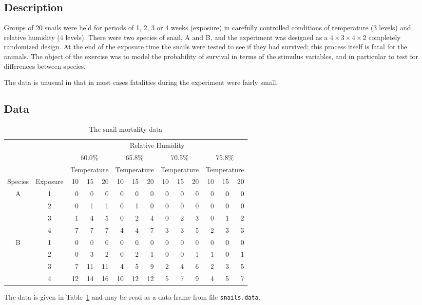 \documentclass{article}
\newcommand{\strutt}{\vrule height 2.5ex depth 0.5ex width 0ex}%
\newcommand{\code}[1]{\texttt{#1}}
\begin{document}
\subsection*{Description}
Groups of 20 snails were held for periods of 1, 2, 3 or 4 weeks (exposure)
in carefully controlled conditions of temperature (3 levels) and relative
humidity (4 levels).  There were two species of snail, A and B, and the
experiment was designed as a $4\times3\times4\times2$ completely randomized
design.  At the end of the exposure time the snails were tested to see if
they had survived; this process itself is fatal for the animals.  The
object of the exercise was to model the probability of survival in terms of
the stimulus variables, and in particular to test for differences between
species.

The data is unusual in that in most cases fatalities during the experiment
were fairly small.

\subsection*{Data}

\begin{table}[ht]
\begin{center}
\begin{tabular}{@{\protect\strutt}|c|c||*{4}{rrr|}}
\hline
\multicolumn{2}{|c||}{}&\multicolumn{12}{c|}{Relative Humidity}\\
\multicolumn{2}{|c||}{}&\multicolumn{3}{c}{60.0\%}&\multicolumn{3}{c}{65.8\%}&%
  \multicolumn{3}{c}{70.5\%}&\multicolumn{3}{c|}{75.8\%}\\
\hline
\multicolumn{2}{|c||}{}&\multicolumn{3}{c|}{Temperature}&%
\multicolumn{3}{|c|}{Temperature}&\multicolumn{3}{c|}{Temperature}&%
\multicolumn{3}{c|}{Temperature}\\
\multicolumn{1}{|c}{Species}& Exposure &
             10 & 15 & 20 & 10 & 15 & 20 & 10 & 15 & 20 & 10 & 15 & 20\\
\hline
A   &  1 &    0 &  0 &  0 &  0 &  0 &  0 &  0 &  0 &  0 &  0 &  0 &  0\\
    &  2 &    0 &  1 &  1 &  0 &  1 &  0 &  0 &  0 &  0 &  0 &  0 &  0\\
    &  3 &    1 &  4 &  5 &  0 &  2 &  4 &  0 &  2 &  3 &  0 &  1 &  2\\
    &  4 &    7 &  7 &  7 &  4 &  4 &  7 &  3 &  3 &  5 &  2 &  3 &  3\\
\hline
\hline
B   &  1 &    0 &  0 &  0 &  0 &  0 &  0 &  0 &  0 &  0 &  0 &  0 &  0\\
    &  2 &    0 &  3 &  2 &  0 &  2 &  1 &  0 &  0 &  1 &  1 &  0 &  1\\
    &  3 &    7 & 11 & 11 &  4 &  5 &  9 &  2 &  4 &  6 &  2 &  3 &  5\\
    &  4 &   12 & 14 & 16 & 10 & 12 & 12 &  5 &  7 &  9 &  4 &  5 &  7\\
\hline
\end{tabular}
\end{center}

\caption{\label{snails} The snail mortality data}
\end{table}
The data is given in Table~\ref{snails} and may be read as a data frame from
file \code{snails.data}.
\end{document}
